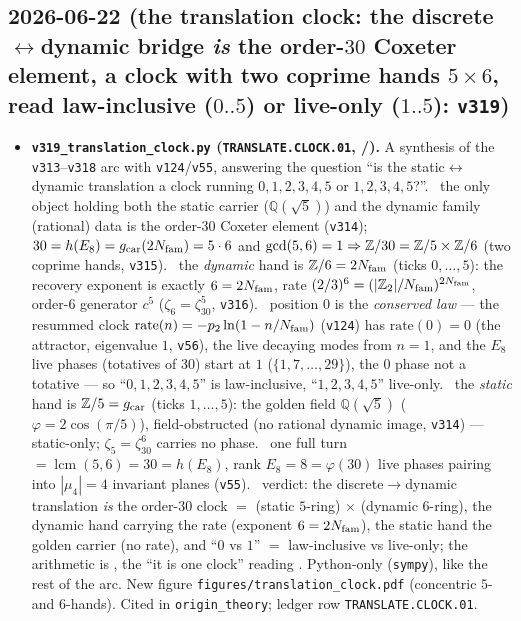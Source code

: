 \subsection*{2026-06-22 (the translation clock: the discrete$\leftrightarrow$dynamic bridge \emph{is} the order-$30$ Coxeter element, a clock with two coprime hands $5\times6$, read law-inclusive ($0..5$) or live-only ($1..5$): \texttt{v319})}
\begin{itemize}
\item \textbf{\texttt{v319\_translation\_clock.py} (\texttt{TRANSLATE.CLOCK.01}, \mE/\mC).} A synthesis of the
  \texttt{v313}--\texttt{v318} arc with \texttt{v124}/\texttt{v55}, answering the question ``is the
  static$\leftrightarrow$dynamic translation a clock running $0,1,2,3,4,5$ or $1,2,3,4,5$?''. \mE\ the only object
  holding both the static carrier ($\mathbb Q(\sqrt5)$) and the dynamic family (rational) data is the order-$30$
  Coxeter element (\texttt{v314}); $30=h(E_8)=g_{\mathrm{car}}(2N_{\mathrm{fam}})=5\cdot6$ and $\gcd(5,6)=1\Rightarrow\mathbb{Z}/30=\mathbb{Z}/5\times\mathbb{Z}/6$
  (two coprime hands, \texttt{v315}). \mE\ the \emph{dynamic} hand is $\mathbb{Z}/6=2N_{\mathrm{fam}}$ (ticks $0,\dots,5$): the recovery
  exponent is exactly $6=2N_{\mathrm{fam}}$, rate $(2/3)^6=(|\mathbb{Z}_2|/N_{\mathrm{fam}})^{2N_{\mathrm{fam}}}$, order-$6$ generator $c^5$
  ($\zeta_6=\zeta_{30}^5$, \texttt{v316}). \mE\ position $0$ is the \emph{conserved law} --- the resummed clock
  $\mathrm{rate}(n)=-p_2\ln(1-n/N_{\mathrm{fam}})$ (\texttt{v124}) has $\mathrm{rate}(0)=0$ (the attractor, eigenvalue $1$,
  \texttt{v56}), the live decaying modes from $n{=}1$, and the $E_8$ live phases (totatives of $30$) start at $1$
  ($\{1,7,\dots,29\}$), the $0$ phase not a totative --- so ``$0,1,2,3,4,5$'' is law-inclusive, ``$1,2,3,4,5$''
  live-only. \mE\ the \emph{static} hand is $\mathbb{Z}/5=g_{\mathrm{car}}$ (ticks $1,\dots,5$): the golden field $\mathbb Q(\sqrt5)$
  ($\varphi=2\cos(\pi/5)$), field-obstructed (no rational dynamic image, \texttt{v314}) --- static-only;
  $\zeta_5=\zeta_{30}^6$ carries no phase. \mE\ one full turn $=\operatorname{lcm}(5,6)=30=h(E_8)$, rank
  $E_8=8=\varphi(30)$ live phases pairing into $|\mu_4|=4$ invariant planes (\texttt{v55}). \mC\ verdict: the
  discrete$\to$dynamic translation \emph{is} the order-$30$ clock $=$ (static $5$-ring) $\times$ (dynamic $6$-ring),
  the dynamic hand carrying the rate (exponent $6=2N_{\mathrm{fam}}$), the static hand the golden carrier (no rate), and
  ``$0$ vs $1$'' $=$ law-inclusive vs live-only; the arithmetic is \mE, the ``it is one clock'' reading \mC.
  Python-only (\texttt{sympy}), like the rest of the arc. New figure \texttt{figures/translation\_clock.pdf}
  (concentric $5$- and $6$-hands). Cited in \texttt{origin\_theory}; ledger row \texttt{TRANSLATE.CLOCK.01}.
\end{itemize}

